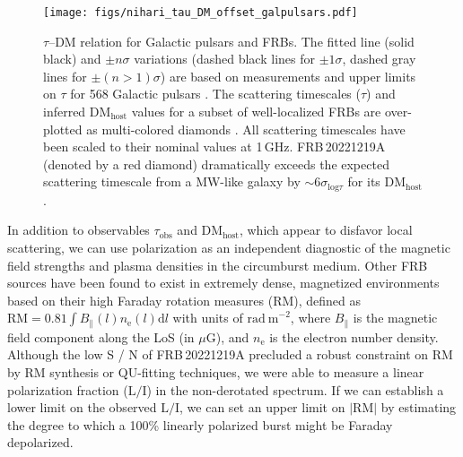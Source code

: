 \documentclass[twocolumn, linenumbers, tra]{aastex631}
\newcommand{\nihari}{FRB\,20221219A } %
\begin{document}
\begin{figure}
  \centering
  \hspace{-0.3cm}
  \texttt{[image: figs/nihari\_tau\_DM\_offset\_galpulsars.pdf]}
  \caption{$\tau$--$\mathrm{DM}$ relation for Galactic pulsars and FRBs. The fitted line (solid black) and $\pm n \sigma$ variations (dashed black lines for $\pm 1\sigma$, dashed gray lines for $\pm(n > 1)\sigma$) are based on measurements and upper limits on $\tau$ for 568 Galactic pulsars \citep[purple x's; data provided by courtesy of J. Cordes, as published in][]{Cordes2016}. The scattering timescales ($\tau$) and inferred $\mathrm{DM}_{\mathrm{host}}$ values for a subset of well-localized FRBs are over-plotted as multi-colored diamonds \citep[from][]{Cordes2022, Ocker2022a, Shin2024}. All scattering timescales have been scaled to their nominal values at 1\,GHz. \nihari (denoted by a red diamond) dramatically exceeds the expected scattering timescale from a MW-like galaxy by $ \sim 6\sigma_{\mathrm{log}\tau}$ for its DM$_{\mathrm{host}}$.}
  \label{fig:tau-DM}
\end{figure}

In addition to observables $\tau_{\mathrm{obs}}$ and DM$_{\mathrm{host}}$, which appear to disfavor local scattering, we can use polarization as an independent diagnostic of the magnetic field strengths and plasma densities in the circumburst medium. Other FRB sources \citep[e.g., FRB\,20121102A;][]{Michilli2018} have been found to exist in extremely dense, magnetized environments based on their high Faraday rotation measures (RM), defined as $\mathrm{RM}=0.81 \int B_{\|}(l) n_{\mathrm{e}}(l) \mathrm{d} l$ with units of $\mathrm{rad\ m}^{-2}$, where $B_{\|}$ is the magnetic field component along the LoS (in $\mu \mathrm{G}$), and $n_{\mathrm{e}}$ is the electron number density. Although the low S / N of \nihari precluded a robust constraint on RM by RM synthesis or $\mathrm{QU}$-fitting techniques, we were able to measure a linear polarization fraction ($\mathrm{L/I}$) in the non-derotated spectrum. If we can establish a lower limit on the observed $\mathrm{L/I}$, we can set an upper limit on $|\mathrm{RM}|$ by estimating the degree to which a 100\% linearly polarized burst might be Faraday depolarized.
\end{document}
